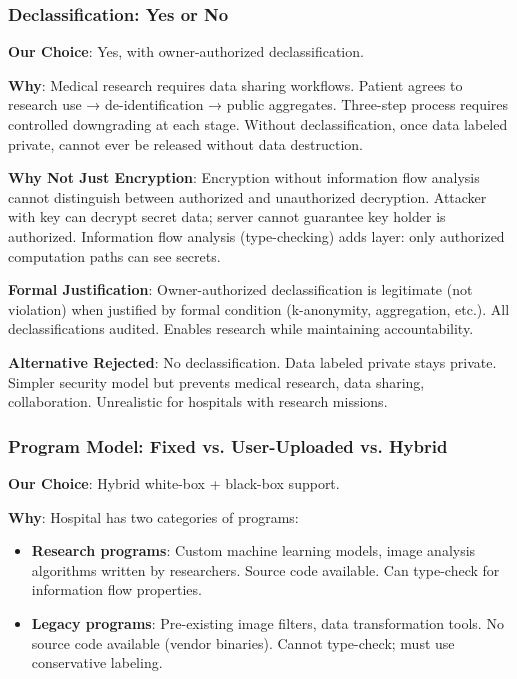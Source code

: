 \subsubsection{Declassification: Yes or No}

\textbf{Our Choice}: Yes, with owner-authorized declassification.

\textbf{Why}: Medical research requires data sharing workflows. Patient agrees to research use → de-identification → public aggregates. Three-step process requires controlled downgrading at each stage. Without declassification, once data labeled private, cannot ever be released without data destruction.

\textbf{Why Not Just Encryption}: Encryption without information flow analysis cannot distinguish between authorized and unauthorized decryption. Attacker with key can decrypt secret data; server cannot guarantee key holder is authorized. Information flow analysis (type-checking) adds layer: only authorized computation paths can see secrets.

\textbf{Formal Justification}: Owner-authorized declassification is legitimate (not violation) when justified by formal condition (k-anonymity, aggregation, etc.). All declassifications audited. Enables research while maintaining accountability.

\textbf{Alternative Rejected}: No declassification. Data labeled private stays private. Simpler security model but prevents medical research, data sharing, collaboration. Unrealistic for hospitals with research missions.

\subsubsection{Program Model: Fixed vs. User-Uploaded vs. Hybrid}

\textbf{Our Choice}: Hybrid white-box + black-box support.

\textbf{Why}: Hospital has two categories of programs:
\begin{itemize}
\item \textbf{Research programs}: Custom machine learning models, image analysis algorithms written by researchers. Source code available. Can type-check for information flow properties.
\item \textbf{Legacy programs}: Pre-existing image filters, data transformation tools. No source code available (vendor binaries). Cannot type-check; must use conservative labeling.
\end{itemize}

